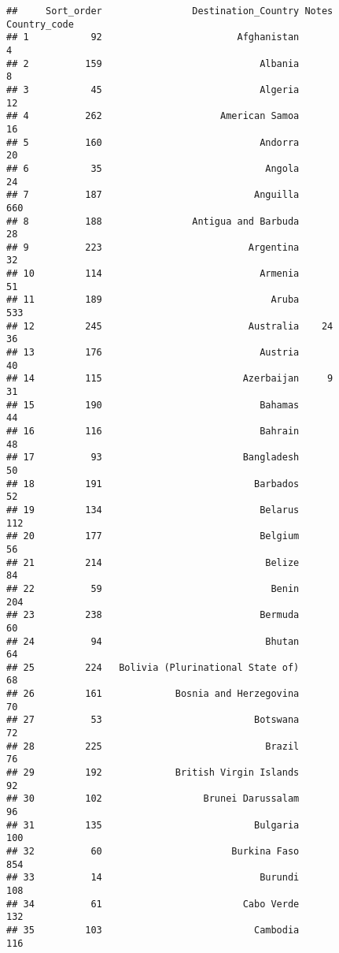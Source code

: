 \documentclass[]{article}
\begin{document}
\begin{verbatim}
##     Sort_order                Destination_Country Notes Country_code
## 1           92                        Afghanistan                  4
## 2          159                            Albania                  8
## 3           45                            Algeria                 12
## 4          262                     American Samoa                 16
## 5          160                            Andorra                 20
## 6           35                             Angola                 24
## 7          187                           Anguilla                660
## 8          188                Antigua and Barbuda                 28
## 9          223                          Argentina                 32
## 10         114                            Armenia                 51
## 11         189                              Aruba                533
## 12         245                          Australia    24           36
## 13         176                            Austria                 40
## 14         115                         Azerbaijan     9           31
## 15         190                            Bahamas                 44
## 16         116                            Bahrain                 48
## 17          93                         Bangladesh                 50
## 18         191                           Barbados                 52
## 19         134                            Belarus                112
## 20         177                            Belgium                 56
## 21         214                             Belize                 84
## 22          59                              Benin                204
## 23         238                            Bermuda                 60
## 24          94                             Bhutan                 64
## 25         224   Bolivia (Plurinational State of)                 68
## 26         161             Bosnia and Herzegovina                 70
## 27          53                           Botswana                 72
## 28         225                             Brazil                 76
## 29         192             British Virgin Islands                 92
## 30         102                  Brunei Darussalam                 96
## 31         135                           Bulgaria                100
## 32          60                       Burkina Faso                854
## 33          14                            Burundi                108
## 34          61                         Cabo Verde                132
## 35         103                           Cambodia                116

\end{verbatim}
\end{document}
